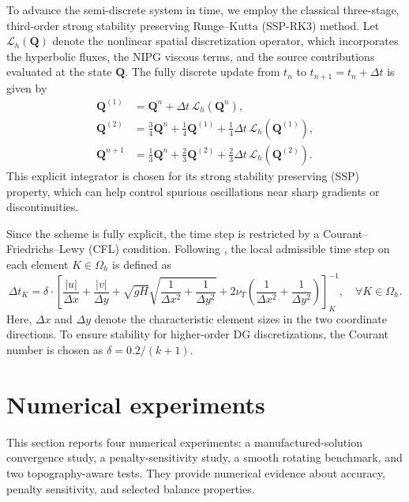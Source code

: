 \documentclass[pdflatex,sn-mathphys-num]{sn-jnl}%
\theoremstyle{thmstyleone}%
\theoremstyle{thmstyletwo}%
\theoremstyle{thmstylethree}%
\begin{document}
To advance the semi-discrete system in time, we employ the classical three-stage, third-order strong stability preserving Runge--Kutta (SSP-RK3) method. Let $\mathcal{L}_h(\mathbf{Q})$ denote the nonlinear spatial discretization operator, which incorporates the hyperbolic fluxes, the NIPG viscous terms, and the source contributions evaluated at the state $\mathbf{Q}$. The fully discrete update from $t_n$ to $t_{n+1} = t_n + \Delta t$ is given by
\begin{equation}
\label{eq:ssprk3}
\begin{aligned}
\mathbf{Q}^{(1)} &= \mathbf{Q}^{n} + \Delta t\,\mathcal{L}_h(\mathbf{Q}^{n}), \\
\mathbf{Q}^{(2)} &= \frac{3}{4}\mathbf{Q}^{n} + \frac{1}{4}\mathbf{Q}^{(1)} + \frac{1}{4}\Delta t\,\mathcal{L}_h(\mathbf{Q}^{(1)}), \\
\mathbf{Q}^{n+1} &= \frac{1}{3}\mathbf{Q}^{n} + \frac{2}{3}\mathbf{Q}^{(2)} + \frac{2}{3}\Delta t\,\mathcal{L}_h(\mathbf{Q}^{(2)}).
\end{aligned}
\end{equation}
This explicit integrator is chosen for its strong stability preserving (SSP) property, which can help control spurious oscillations near sharp gradients 
or discontinuities.

Since the scheme is fully explicit, the time step is restricted by a Courant–Friedrichs–Lewy (CFL) condition. Following \cite{Anderson1995}, the local admissible time step on each element $K \in \Omega_h$ is defined as
\begin{equation}
\label{eq:cfl}
\Delta t_K = \delta \cdot \left[ \frac{|u|}{\Delta x} + \frac{|v|}{\Delta y} + \sqrt{gH}\sqrt{\frac{1}{\Delta x^2} + \frac{1}{\Delta y^2}} + 2 \nu_{T} \left( \frac{1}{\Delta x^2} + \frac{1}{\Delta y^2} \right) \right]_K^{-1}, \quad \forall K \in \Omega_h.
\end{equation}
Here, $\Delta x$ and $\Delta y$ denote the characteristic element sizes in the two coordinate directions. To ensure stability for higher-order DG discretizations, the Courant number is chosen as $\delta = 0.2/(k+1)$.

\section{Numerical experiments}
\label{sec:numerics}

This section reports four numerical experiments: a manufactured-solution convergence study, a penalty-sensitivity study, 
a smooth rotating benchmark, and two topography-aware tests. They provide numerical evidence about accuracy, penalty sensitivity, and selected balance properties.
\end{document}
